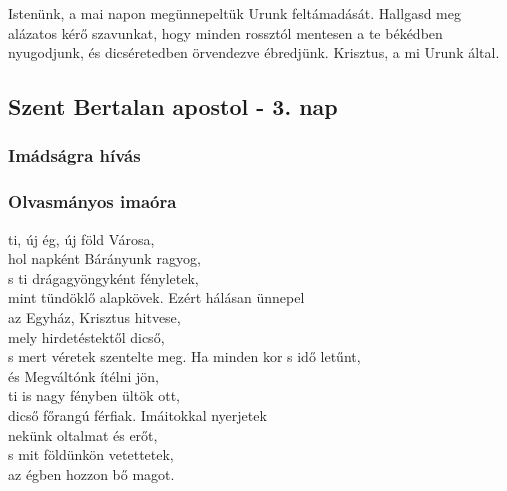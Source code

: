 \documentclass[twoside]{article}
\begin{document}
Istenünk, a mai napon megünnepeltük Urunk feltámadását. Hallgasd meg alázatos kérő szavunkat, hogy
minden rossztól mentesen a te békédben nyugodjunk, és dicséretedben örvendezve ébredjünk. Krisztus,
a mi Urunk által.

\subsection*{Szent Bertalan apostol - 3. nap}
{\centering{}}


\subsubsection*{Imádságra hívás}

\subsubsection*{Olvasmányos imaóra}

\begin{hymnstanzas}
    ti, új ég, új föld Városa,\\
    hol napként Bárányunk ragyog,\\
    s ti drágagyöngyként fényletek,\\
    mint tündöklő alapkövek.
\stanzabreak
    Ezért hálásan ünnepel\\
    az Egyház, Krisztus hitvese,\\
    mely hirdetéstektől dicső,\\
    s mert véretek szentelte meg.
\stanzabreak
    Ha minden kor s idő letűnt,\\
    és Megváltónk ítélni jön,\\
    ti is nagy fényben ültök ott,\\
    dicső főrangú férfiak.
\stanzabreak
    Imáitokkal nyerjetek\\
    nekünk oltalmat és erőt,\\
    s mit földünkön vetettetek,\\
    az égben hozzon bő magot.
\end{hymnstanzas}
\end{document}
